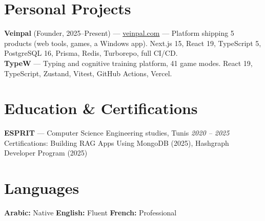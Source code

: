 \documentclass[10pt,a4paper]{article}
\newcommand{\entry}[3]{%
  \textbf{#1} --- #2 \hfill {\color{gray}\textit{#3}}\par}
\begin{document}
{%

}

\section*{Personal Projects}
{\small
\textbf{Veinpal} (Founder, 2025--Present) --- \href{https://veinpal.com/apps}{veinpal.com} ---
Platform shipping 5 products (web tools, games, a Windows app). Next.js 15, React 19,
TypeScript 5, PostgreSQL 16, Prisma, Redis, Turborepo, full CI/CD.\\[2pt]
\textbf{TypeW} --- Typing and cognitive training platform, 41 game modes.
React 19, TypeScript, Zustand, Vitest, GitHub Actions, Vercel.
}

\section*{Education \& Certifications}
{\small
\textbf{ESPRIT} --- Computer Science Engineering studies, Tunis \hfill {\color{gray}\textit{2020 -- 2025}}\\[1pt]
Certifications: Building RAG Apps Using MongoDB (2025), Hashgraph Developer Program (2025)
}

\section*{Languages}
{\small \textbf{Arabic:} Native \quad \textbf{English:} Fluent \quad \textbf{French:} Professional}
\end{document}
